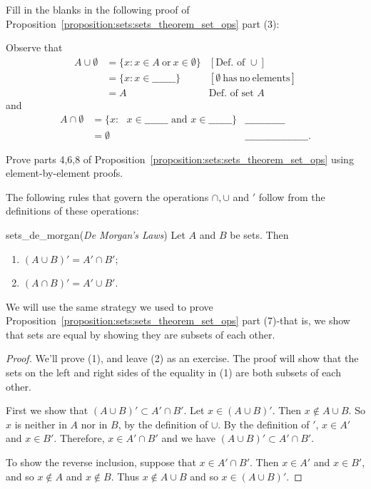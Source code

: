 \begin{exercise}{}
Fill in the blanks in the following proof of Proposition~\ref{proposition:sets:sets_theorem_set_ops} part (3):

\medskip{}
\noindent
Observe that
\begin{align*}
A \cup \emptyset & =  \{ x : x \in A \mathrm{~or~}x \in \emptyset \}    & [\text{Def. of }\cup] \\
& = \{ x : x \in \_\_\_\_\_\_\_ \}     & [\emptyset \mathrm{~has~no~elements}] \\
& =  A & \text{Def. of set }A 
\end{align*}
and
\begin{align*}
A \cap \emptyset & =  \{ x : \mbox{ $x \in \_\_\_\_\_\_\_$ and $x \in \_\_\_\_\_\_\_$} \}     & \_\_\_\_\_\_\_\_\_\_\_\_ \\
& =  \emptyset     & \_\_\_\_\_\_\_\_\_\_\_\_\_\_\_\_\_\_\_ .
\end{align*}
\end{exercise}

\begin{exercise}{26}
Prove parts 4,6,8 of Proposition~\ref{proposition:sets:sets_theorem_set_ops} using element-by-element proofs.
\end{exercise}

\medskip{}
\noindent
The following rules that govern the operations $\cap, \cup$ and $'$  follow from the definitions of these operations:

\begin{prop}{sets_de_morgan}(\emph{De Morgan's Laws}) 
Let $A$ and $B$ be sets. Then 
\begin{enumerate}[(1)]
 \item
$(A \cup B)' = A' \cap B'$; 
 \item
$(A \cap B)' = A' \cup B'$.
 \end{enumerate}
\end{prop}
 
 We will use the same strategy we used to prove Proposition~\ref{proposition:sets:sets_theorem_set_ops} part (7)-that is, we show that sets are equal by showing they are subsets of each other.
\medskip{}

\begin{proof} 

\noindent
We'll prove (1), and leave (2) as an exercise. The proof will show that the sets on the left and right sides of the equality in (1)  are both subsets of each other.

First we show that $(A \cup B)' \subset A' \cap B'$.  Let $x \in (A \cup B)'$.  Then $x \notin A \cup B$. So $x$ is neither in $A$ nor in $B$, by the definition of $\cup$.  By the definition of $'$, $x \in A'$ and $x \in B'$.  Therefore, $x \in A' \cap B'$ and we have $(A \cup B)' \subset A' \cap B'$.

 To show the reverse inclusion, suppose that $x \in A' \cap B'$.  Then $x \in A'$ and $x \in B'$, and so $x \notin A$ and $x \notin B$.  Thus $x \notin A \cup B$ and so $x \in (A \cup B)'$.  
\end{proof}

